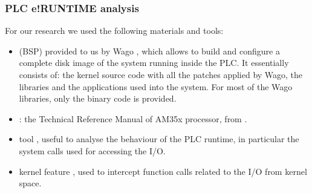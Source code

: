 \subsubsection{PLC e!RUNTIME analysis}

For our research we used the following materials and tools:
\begin{itemize}
	\item {} (BSP) provided to us by Wago \cite{wago-linux}, which allows to build and configure a complete disk image
	of the system running inside the PLC. It essentially consists of: the kernel source code with all the patches applied by Wago, the libraries and
	the applications used into the system. For most of the Wago libraries, only the binary code is provided.
	\item {}: the Technical Reference Manual of AM35x processor, from \cite{am35x}.
	\item {} tool \cite{strace}, useful to analyse the behaviour of the PLC runtime, in particular the system calls used for accessing the I/O.
	\item {} kernel feature \cite{kprobes}, used to intercept function calls related to the I/O from kernel space.
\end{itemize}

